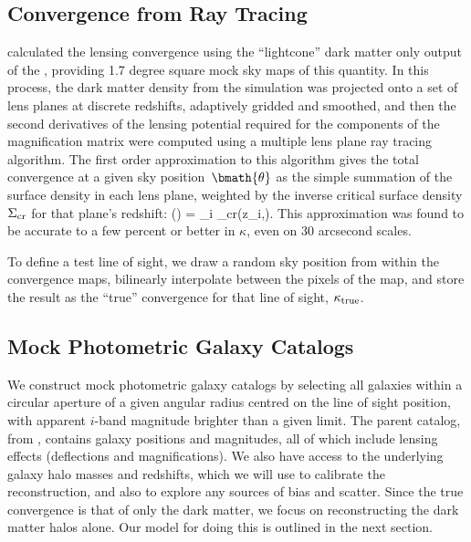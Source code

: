\documentclass[useAMS,usenatbib]{mn2e}
\begin{document}

\subsection{Convergence from Ray Tracing}
\label{sec:MS:raytracing}

\citet{HilbertEtal2009} calculated the lensing convergence using the
``lightcone'' dark matter only 
output of the \MS, providing 1.7 degree square 
mock sky maps of this
quantity. In this process, the dark matter density from the simulation
was projected onto a set of lens planes at discrete redshifts,
adaptively gridded and smoothed, and then the second derivatives of the 
lensing potential required for the components of the magnification
matrix were computed using a multiple lens plane ray tracing algorithm.
The first order approximation to this algorithm \citep[equation 17
of][]{HilbertEtal2009} gives the total convergence at a given sky
position~$\bmath{\theta}$ as the simple summation of the surface density
in each lens plane, weighted by the inverse critical surface density
$\Sigma_{\rm cr}$ for that plane's redshift:
\be
\kappa(\bmath{\theta}) = \sum_i 
                                     {\Sigma_{\rm cr}(z_i,\zs)}.
\ee
This approximation was found to be accurate to a few percent or better
in $\kappa$, even on 30 arcsecond scales.

To define a test line of sight, we draw a random sky position from
within the convergence maps, bilinearly interpolate between the pixels
of the map, and store the result as the ``true'' convergence for that
line of sight, $\kappa_{\rm true}$. 



\subsection{Mock Photometric Galaxy Catalogs}
\label{sec:MS:mocks}

We construct mock photometric galaxy catalogs by selecting all \MS
galaxies within a circular aperture of a given angular radius centred on
the line of sight position, with apparent $i$-band magnitude brighter
than a given limit. The parent catalog, from \citet{HilbertEtal2011},
contains galaxy positions and magnitudes, all of which include lensing
effects (deflections and magnifications). We also have access to the
underlying galaxy halo masses and redshifts, which we will use to
calibrate the reconstruction, and also to explore any sources of bias
and scatter. Since the true convergence is that of only the dark matter,
we focus on reconstructing the dark matter halos alone. Our model for
doing this is outlined in the next section. 
\end{document}
